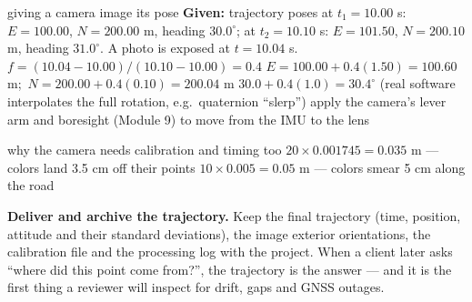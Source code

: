 \begin{worked}{giving a camera image its pose}
\textbf{Given:} trajectory poses at $t_1=10.00$ s: $E=100.00$, $N=200.00$ m, heading $30.0^\circ$; at $t_2=10.10$ s: $E=101.50$, $N=200.10$ m, heading $31.0^\circ$. A photo is exposed at $t=10.04$ s.
 $f=(10.04-10.00)/(10.10-10.00)=0.4$
 $E=100.00+0.4(1.50)=100.60$ m;\ $N=200.00+0.4(0.10)=200.04$ m
 $30.0+0.4(1.0)=30.4^\circ$ (real software interpolates the full rotation, e.g.\ quaternion ``slerp'')
 apply the camera's lever arm and boresight (Module 9) to move from the IMU to the lens
\end{worked}

\begin{worked}{why the camera needs calibration and timing too}
 $20\times0.001745=0.035$ m --- colors land 3.5 cm off their points
 $10\times0.005=0.05$ m --- colors smear 5 cm along the road
\end{worked}

\begin{tip}
\textbf{Deliver and archive the trajectory.} Keep the final trajectory (time, position, attitude and their standard deviations), the image exterior orientations, the calibration file and the processing log with the project. When a client later asks ``where did this point come from?'', the trajectory is the answer --- and it is the first thing a reviewer will inspect for drift, gaps and GNSS outages.
\end{tip}

